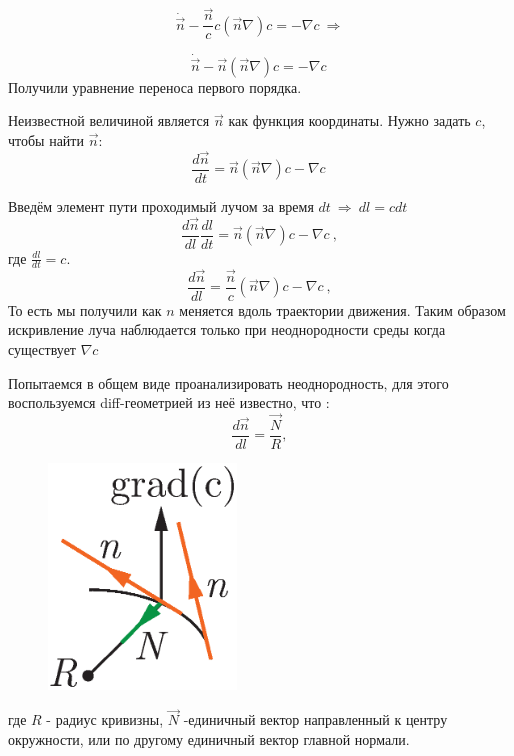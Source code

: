 \documentclass[14pt,a4paper,oneside]{extarticle}	%
\begin{document}
\begin{equation*}
\dot{\vec{n}} -  \frac{\vec{n}}{c}c(\vec{n}\nabla)c = -\nabla c \:\Rightarrow
\end{equation*}
 
\begin{equation*}
\dot{\vec{n}} - \vec{n}(\vec{n}\nabla)c = -\nabla c \:
\end{equation*}
Получили уравнение переноса первого порядка.

Неизвестной величиной является $ \vec{n} $ как функция координаты.
Нужно задать $ c $, чтобы найти $ \vec{n} $:
\begin{equation*}
\frac{d\vec{n}}{dt} = \vec{n}(\vec{n}\nabla)c - \nabla c \:
\end{equation*}

Введём элемент пути проходимый лучом за время $ dt \:\Rightarrow\: dl=cdt $
\begin{equation*}
\frac{d\vec{n}}{dl}\frac{dl}{dt} = \vec{n}(\vec{n}\nabla)c - \nabla c \:,
\end{equation*}
где $ \frac{dl}{dt} = c $.
\begin{equation}\label{66}
\frac{d\vec{n}}{dl} = \frac{\vec{n}}{c}(\vec{n}\nabla)c - \nabla c \:,
\end{equation}
То есть мы получили как $ n $ меняется вдоль траектории движения. 
Таким образом искривление луча наблюдается только при неоднородности среды когда существует $ \nabla c $

Попытаемся в общем виде проанализировать неоднородность, для этого воспользуемся diff-геометрией из неё известно, что :
\begin{equation}\label{67}
\frac{d\vec{n}}{dl} = \frac{\vec{N}}{R},
\end{equation}
\begin{figure}[h!] 	%
	\centering 		%
	\includegraphics[width=5cm]{7.eps} %
	\label{fig::7}
\end{figure}
где $ R $ - радиус кривизны, $ \vec{N}  $ -единичный вектор направленный к центру окружности, или по другому единичный вектор главной нормали.
\end{document}
